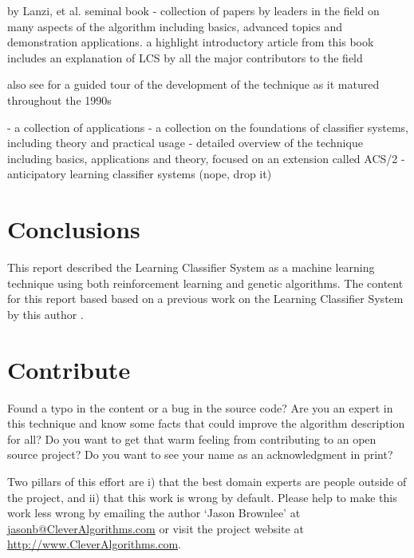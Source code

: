 \documentclass[a4paper, 11pt]{article}
\makeatletter
\newcommand{\myreportauthor}{Jason Brownlee}
\newcommand{\myreportemail}{jasonb@CleverAlgorithms.com}
\newcommand{\myreportwebsite}{http://www.CleverAlgorithms.com}
\makeatother
\begin{document}
by Lanzi, et al.
seminal book \cite{Lanzi2000} - collection of papers by leaders in the field on many aspects of the algorithm including basics, advanced topics and demonstration applications.
a highlight introductory article from this book includes an explanation of LCS by all the major contributors to the field \cite{Holland2000}

also see for a guided tour of the development of the technique as it matured throughout the 1990s \cite{Lanzi2000a}


\cite{Bull2004} - a collection of applications 
\cite{Bull2005} - a collection on the foundations of classifier systems, including theory and practical usage
\cite{Butz2002} - detailed overview of the technique including basics, applications and theory, focused on an extension called ACS/2 - anticipatory learning classifier systems (nope, drop it)


% 
% 
\section{Conclusions}
\label{sec:conclusions}
This report described the Learning Classifier System as a machine learning technique using both reinforcement learning and genetic algorithms. The content for this report based based on a previous work on the Learning Classifier System by this author \cite{Brownlee2007a}.

% 
% 
\section{Contribute}
\label{sec:contribute}
Found a typo in the content or a bug in the source code? 
Are you an expert in this technique and know some facts that could improve the algorithm description for all?
Do you want to get that warm feeling from contributing to an open source project? 
Do you want to see your name as an acknowledgment in print?

Two pillars of this effort are i) that the best domain experts are people outside of the project, and ii) that this work is wrong by default. 
Please help to make this work less wrong by emailing the author `\myreportauthor' at \url{\myreportemail} or visit the project website at \url{\myreportwebsite}.



\end{document}

